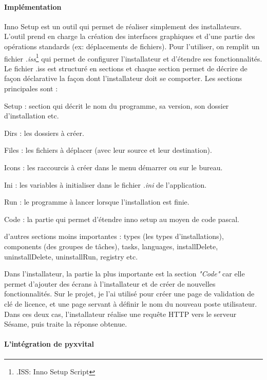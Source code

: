 \paragraph*{Implémentation\\}
Inno Setup est un outil qui permet de réaliser simplement des installateurs. L'outil prend en charge la création des interfaces graphiques et d'une partie des opérations standards (ex: déplacements de fichiers). Pour l'utiliser, on remplit un fichier \textit{.iss}\footnote{.ISS: Inno Setup Script} qui permet de configurer l'installateur et d'étendre ses fonctionnalités. Le fichier .iss est structuré en sections et chaque section permet de décrire de façon déclarative la façon dont l'installateur doit se comporter. Les sections principales sont : 
\begin{sitemize}
\item Setup : section qui décrit le nom du programme, sa version, son dossier d'installation etc.
\item Dirs : les dossiers à créer.
\item Files : les fichiers à déplacer (avec leur source et leur destination).
\item Icons : les raccourcis à créer dans le menu démarrer ou sur le bureau.
\item Ini : les variables à initialiser dans le fichier \textit{.ini} de l'application.
\item Run : le programme à lancer lorsque l'installation est finie.
\item Code : la partie qui permet d'étendre inno setup au moyen de code pascal.
\item d'autres sections moins importantes : types (les types d'installations), components (des groupes de tâches), tasks, languages, installDelete, uninstallDelete, uninstallRun, registry etc.
\end{sitemize}  

Dans l'installateur, la partie la plus importante est la section \textit{"Code"} car elle permet d'ajouter des écrans à l'installateur et de créer de nouvelles fonctionnalités. Sur le projet, je l'ai utilisé pour créer une page de validation de clé de licence, et une page servant à définir le nom du nouveau poste utilisateur.\\
Dans ces deux cas, l'installateur réalise une requête HTTP vers le serveur Sésame, puis traite la réponse obtenue. 

\paragraph*{L'intégration de pyxvital\\}

